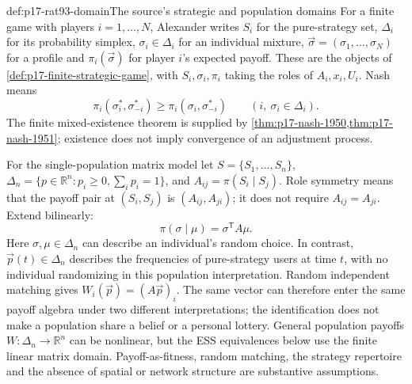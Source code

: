 \begin{hbdefinition}{def:p17-rat93-domain}{The source's strategic and population domains}
For a finite game with players \(i=1,\ldots,N\), Alexander writes
\(S_i\) for the pure-strategy set, \(\Delta_i\) for its probability
simplex, \(\sigma_i\in\Delta_i\) for an individual mixture,
\(\vec\sigma=(\sigma_1,\ldots,\sigma_N)\) for a profile and
\(\pi_i(\vec\sigma)\) for player \(i\)'s expected payoff.
These are the objects of \cref{def:p17-finite-strategic-game}, with
\(S_i,\sigma_i,\pi_i\) taking the roles of \(A_i,x_i,U_i\).
Nash means
\[
 \pi_i(\sigma_i^*,\sigma_{-i}^*)\geq
 \pi_i(\sigma_i,\sigma_{-i}^*)\qquad(i,\ \sigma_i\in\Delta_i).
\]
The finite mixed-existence theorem is supplied by
\cref{thm:p17-nash-1950,thm:p17-nash-1951}; existence does not imply
convergence of an adjustment process.

For the single-population matrix model let \(S=\{S_1,\ldots,S_n\}\),
\(\Delta_n=\{p\in\mathbb R^n:p_i\geq0,\sum_i p_i=1\}\), and
\(A_{ij}=\pi(S_i\mid S_j)\). Role symmetry means that the payoff
pair at \((S_i,S_j)\) is \((A_{ij},A_{ji})\); it does not require
\(A_{ij}=A_{ji}\). Extend bilinearly:
\[
       \pi(\sigma\mid\mu)=\sigma^{\mathsf T}A\mu.
\]
Here \(\sigma,\mu\in\Delta_n\) can describe an individual's random
choice. In contrast, \(\vec p(t)\in\Delta_n\) describes the
frequencies of pure-strategy users at time \(t\), with no individual
randomizing in this population interpretation. Random independent
matching gives \(W_i(\vec p)=(A\vec p)_i\). The same vector can
therefore enter the same payoff algebra under two different interpretations;
the identification does not make a population share a belief or a personal
lottery. General population payoffs \(W:\Delta_n\to\mathbb R^n\)
can be nonlinear, but the ESS equivalences below use the finite linear
matrix domain. Payoff-as-fitness, random matching, the strategy repertoire
and the absence of spatial or network structure are substantive assumptions.
\end{hbdefinition}

